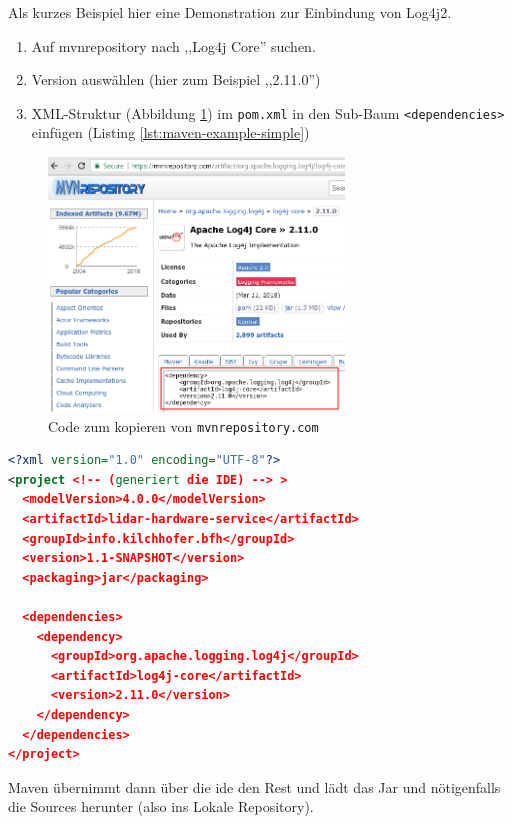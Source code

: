 Als kurzes Beispiel hier eine Demonstration zur Einbindung von Log4j2.
\begin{enumerate}
	\item Auf mvnrepository nach ,,Log4j Core'' suchen.
	\item Version auswählen (hier zum Beispiel ,,2.11.0'')
	\item XML-Struktur (Abbildung \ref{fig:mvnrepository-example}) im \texttt{pom.xml} in den Sub-Baum \texttt{<dependencies>} einfügen (Listing \ref{lst:maven-example-simple})
\end{enumerate}

\begin{figure}[H]
	\centering
	\includegraphics[width=0.7\textwidth]{img/mvnrepository-log4j-example.png}
	\caption{Code zum kopieren von \texttt{mvnrepository.com}}
	\label{fig:mvnrepository-example}
\end{figure}

\begin{lstlisting}[language=XML, caption={Simples Beispiel wie ein pom.xml aussieht},label={lst:maven-example-simple}]
<?xml version="1.0" encoding="UTF-8"?>
<project <!-- (generiert die IDE) --> >
  <modelVersion>4.0.0</modelVersion>
  <artifactId>lidar-hardware-service</artifactId>
  <groupId>info.kilchhofer.bfh</groupId>
  <version>1.1-SNAPSHOT</version>
  <packaging>jar</packaging>

  <dependencies>
    <dependency>
      <groupId>org.apache.logging.log4j</groupId>
      <artifactId>log4j-core</artifactId>
      <version>2.11.0</version>
    </dependency>
  </dependencies>
</project>
\end{lstlisting}
Maven übernimmt dann über die \acrshort{ide} den Rest und lädt das Jar und nötigenfalls die Sources herunter (also ins Lokale Repository).

